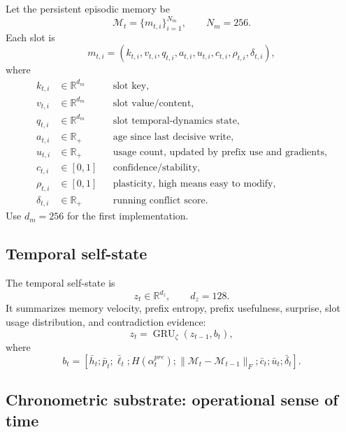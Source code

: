 \documentclass[11pt]{article}
\newcommand{\R}{\mathbb{R}}
\newcommand{\Mem}{\mathcal{M}}
\begin{document}
Let the persistent episodic memory be
\begin{equation}
    \Mem_t = \{m_{t,i}\}_{i=1}^{N_m}, \qquad N_m=256.
\end{equation}
Each slot is
\begin{equation}
    m_{t,i}=\left(k_{t,i},v_{t,i},q_{t,i},a_{t,i},u_{t,i},c_{t,i},\rho_{t,i},\delta_{t,i}\right),
\end{equation}
where
\begin{align*}
    k_{t,i}&\in\R^{d_m} && \text{slot key},\\
    v_{t,i}&\in\R^{d_m} && \text{slot value/content},\\
    q_{t,i}&\in\R^{d_m} && \text{slot temporal-dynamics state},\\
    a_{t,i}&\in\R_+ && \text{age since last decisive write},\\
    u_{t,i}&\in\R_+ && \text{usage count, updated by prefix use and gradients},\\
    c_{t,i}&\in[0,1] && \text{confidence/stability},\\
    \rho_{t,i}&\in[0,1] && \text{plasticity, high means easy to modify},\\
    \delta_{t,i}&\in\R_+ && \text{running conflict score}.
\end{align*}
Use \(d_m=256\) for the first implementation.

\subsection{Temporal self-state}

The temporal self-state is
\begin{equation}
    z_t\in\R^{d_z}, \qquad d_z=128.
\end{equation}
It summarizes memory velocity, prefix entropy, prefix usefulness, surprise, slot usage distribution, and contradiction evidence:
\begin{equation}
    z_t = \operatorname{GRU}_\zeta(z_{t-1}, b_t),
\end{equation}
where
\begin{equation}
    b_t = [\bar{h}_t;\bar{p}_t;\bar{\ell}_t;H(\alpha_t^{pre});\|\Mem_t-\Mem_{t-1}\|_F;\bar{c}_t;\bar{u}_t;\bar{\delta}_t].
\end{equation}


\subsection{Chronometric substrate: operational sense of time}
\end{document}
